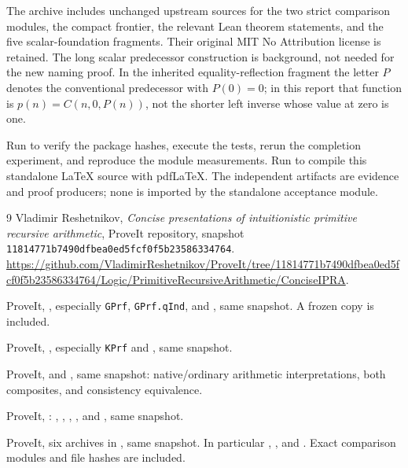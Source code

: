 The archive includes unchanged upstream sources for the two strict
comparison modules, the compact frontier, the relevant Lean theorem
statements, and the five scalar-foundation fragments. Their original
MIT No Attribution license is retained. The long scalar predecessor
construction is background, not needed for the new naming proof.
In the inherited equality-reflection fragment the letter $P$ denotes
the conventional predecessor with $P(0)=0$; in this report that function
is $p(n)=C(n,0,P(n))$, not the shorter left inverse whose value at zero
is one.

Run  to verify the package hashes, execute the tests,
rerun the completion experiment, and reproduce the module measurements.
Run  to compile this standalone LaTeX source with
pdfLaTeX. The independent artifacts are evidence and proof producers;
none is imported by the standalone acceptance module.

\begin{thebibliography}{9}
 Vladimir Reshetnikov, \emph{Concise presentations of
intuitionistic primitive recursive arithmetic}, ProveIt repository,
snapshot \texttt{11814771b7490dfbea0ed5fcf0f5b23586334764}.
\url{https://github.com/VladimirReshetnikov/ProveIt/tree/11814771b7490dfbea0ed5fcf0f5b23586334764/Logic/PrimitiveRecursiveArithmetic/ConciseIPRA}.

 ProveIt, ,
especially \texttt{GPrf}, \texttt{GPrf.qInd}, and
, same snapshot. A frozen copy is included.

 ProveIt,
,
especially \texttt{KPrf} and , same snapshot.

 ProveIt,
 and
, same snapshot: native/ordinary arithmetic
interpretations, both composites, and consistency equivalence.

 ProveIt,
:
,
,
,
, and
, same snapshot.

 ProveIt, six archives in
, same snapshot. In particular
,
, and
.
Exact comparison modules and file hashes are included.
\end{thebibliography}

